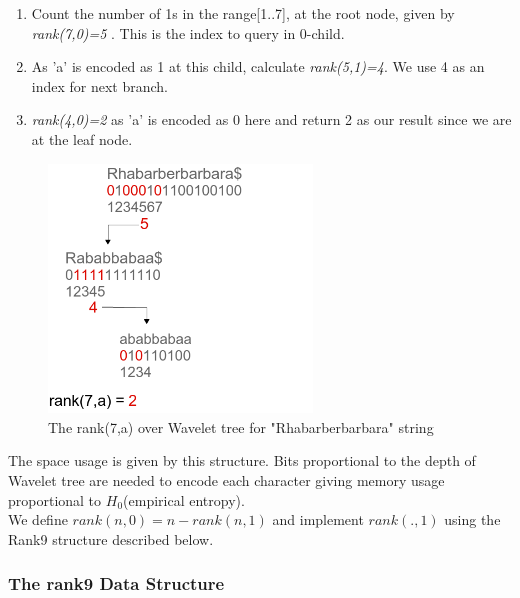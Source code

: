 \documentclass[11pt,a4paper]{report}
\begin{document}
\begin{enumerate}

    \item
		 Count the number of 1s in the range[1..7], at the root node, 
		 given by \emph{rank(7,0)=5 }. This is the index to query in 0-child.
		 
    \item
		As 'a' is encoded as 1 at this child, calculate \emph{rank(5,1)=4}. 
		We use 4 as an index for next branch.

    \item
		\emph{rank(4,0)=2} as 'a' is encoded as 0 here and return 2 as our
		 result since we are at the leaf node.

\end{enumerate}

\begin{figure}[H]
\centering
\includegraphics[width=7cm]{pictures/rank1.png}
\caption{The rank(7,a) over Wavelet tree for "Rhabarberbarbara" string }
\label{rank1}
\end{figure}

The space usage is given by this structure.
Bits proportional to the depth of  Wavelet tree are needed to encode
each character giving memory usage proportional to $H_{0}$(empirical entropy)\cite{entropy}.\\

We define \emph{$rank(n,0)= n- rank(n,1)$} and implement \emph{$rank(. , 1)$}
using the Rank9 structure described below.


\subsubsection{The rank9 Data Structure}

\end{document}
